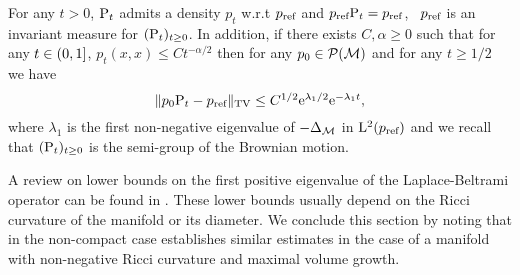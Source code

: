 \begin{proposition}
\label{prop:brownian_conv_repeat}
  For any $t > 0$, $\mathrm{P}_t$ admits a density $p_t$ w.r.t $p_{\textup{ref}}$ and
  $p_{\textup{ref}} \mathrm{P}_t = p_{\textup{ref}}$, \ie \ $p_{\textup{ref}}$ is an invariant measure for
  $(\mathrm{P}_t)_{t \geq 0}$. In addition, if there exists $C, \alpha \geq 0$ such
  that for any $t \in \left(0,1\right]$, $p_t(x,x) \leq C t^{-\alpha /2}$ then 
  for any $p_0 \in \mathcal{P}(\mathcal M)$ and for any $t \geq 1/2$ we have 
  \begin{equation}
    \textstyle{\| p_0\mathrm{P}_t - p_{\textup{ref}} \|_{\mathrm{TV}} \leq C^{1/2} \mathrm{e}^{\lambda_1 /2} \mathrm{e}^{-\lambda_1 t}  ,}
  \end{equation}
  where $\lambda_1$ is the first non-negative eigenvalue of $-\Delta_\mathcal M$ in
  $\mathrm{L}^2(p_{\textup{ref}})$ and we recall that $(\mathrm{P}_t)_{t \geq 0}$ is the
  semi-group of the Brownian motion.
\end{proposition}
A review on lower bounds on the first positive eigenvalue
of the Laplace-Beltrami operator can be found in \citep{he2013lower}. These lower
bounds usually depend on the Ricci curvature of the manifold or its diameter. We
conclude this section by noting that in the non-compact case \citep{li1986large}
establishes similar estimates in the case of a manifold with non-negative Ricci
curvature and maximal volume growth.


